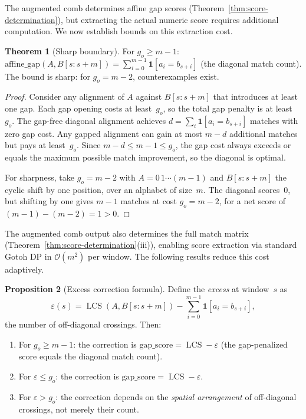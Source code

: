 \documentclass[11pt, a4paper]{article}
\theoremstyle{definition}
\newtheorem{theorem}{Theorem}
\newtheorem{proposition}[theorem]{Proposition}
\theoremstyle{remark}
\newcommand{\LCS}{\operatorname{LCS}}
\newcommand{\bigO}{\mathcal{O}}
\begin{document}
The augmented comb determines affine gap scores
(Theorem~\ref{thm:score-determination}), but extracting the
actual numeric score requires additional computation.
We now
establish bounds on this extraction cost.

\begin{theorem}[Sharp boundary]
\label{thm:sharp-boundary}
For $g_o \geq m - 1$:
$\mathrm{affine\_gap}(A, B[s{:}s{+}m])
  = \sum_{i=0}^{m-1} \mathbf{1}[a_i = b_{s+i}]$
(the diagonal match count).
The bound is sharp: for
$g_o = m - 2$, counterexamples exist.
\end{theorem}

\begin{proof}
Consider any alignment of $A$ against $B[s{:}s{+}m]$ that
introduces at least one gap.
Each gap opening costs at
least~$g_o$, so the total gap penalty is at least~$g_o$.
The
gap-free diagonal alignment achieves
$d = \sum_{i} \mathbf{1}[a_i = b_{s+i}]$ matches with zero gap
cost.
Any gapped alignment can gain at most $m - d$ additional
matches but pays at least~$g_o$.
Since
$m - d \leq m - 1 \leq g_o$, the gap cost always exceeds or
equals the maximum possible match improvement, so the diagonal
is optimal.

For sharpness, take $g_o = m - 2$ with
$A = 0\,1 \cdots (m{-}1)$ and $B[s{:}s{+}m]$ the cyclic shift
by one position, over an alphabet of size~$m$.
The diagonal
scores~$0$, but shifting by one gives $m{-}1$ matches at cost
$g_o = m{-}2$, for a net score of $(m{-}1) - (m{-}2) = 1 > 0$.
\end{proof}

The augmented comb output also determines the full match matrix
(Theorem~\ref{thm:score-determination}(iii)), enabling score
extraction via standard Gotoh DP in $\bigO(m^2)$ per window.
The following results reduce this cost adaptively.

\begin{proposition}[Excess correction formula]
\label{prop:excess-correction}
Define the \emph{excess} at window~$s$ as
\[
  \varepsilon(s) = \LCS(A, B[s{:}s{+}m]) - \textstyle\sum_{i=0}^{m-1} \mathbf{1}[a_i = b_{s+i}],
\]
the number of off-diagonal crossings.
Then:
\begin{enumerate}
  \item For $g_o \geq m - 1$: the correction is
    $\mathrm{gap\_score} = \LCS - \varepsilon$
    (the gap-penalized score equals the diagonal match count).
  \item For $\varepsilon \leq g_o$: the correction is
    $\mathrm{gap\_score} = \LCS - \varepsilon$.
  \item For $\varepsilon > g_o$: the correction depends on the
    \emph{spatial arrangement} of off-diagonal crossings, not
    merely their count.
\end{enumerate}
\end{proposition}
\end{document}
